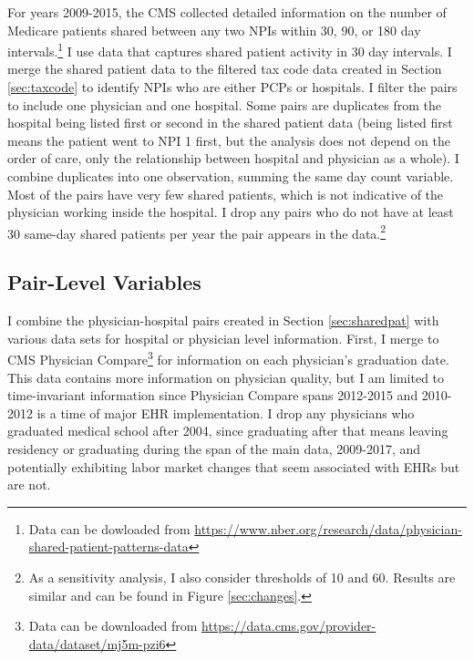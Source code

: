\documentclass[12pt]{article}
\begin{document}
For years 2009-2015, the CMS collected detailed information on the number of Medicare patients shared between any two NPIs within 30, 90, or 180 day intervals.\footnote{Data can be dowloaded from \hyperlink{https://www.nber.org/research/data/physician-shared-patient-patterns-data}{https://www.nber.org/research/data/physician-shared-patient-patterns-data}} I use data that captures shared patient activity in 30 day intervals. I merge the shared patient data to the filtered tax code data created in Section \ref{sec:taxcode} to identify NPIs who are either PCPs or hospitals. I filter the pairs to include one physician and one hospital. Some pairs are duplicates from the hospital being listed first or second in the shared patient data (being listed first means the patient went to NPI 1 first, but the analysis does not depend on the order of care, only the relationship between hospital and physician as a whole). I combine duplicates into one observation, summing the same day count variable. Most of the pairs have very few shared patients, which is not indicative of the physician working inside the hospital. I drop any pairs who do not have at least 30 same-day shared patients per year the pair appears in the data.\footnote{As a sensitivity analysis, I also consider thresholds of 10 and 60. Results are similar and can be found in Figure \ref{sec:changes}.}

\subsection{Pair-Level Variables}

I combine the physician-hospital pairs created in Section \ref{sec:sharedpat} with various data sets for hospital or physician level information. First, I merge to CMS Physician Compare\footnote{Data can be downloaded from \hyperlink{https://data.cms.gov/provider-data/dataset/mj5m-pzi6}{https://data.cms.gov/provider-data/dataset/mj5m-pzi6}} for information on each physician's graduation date. This data contains more information on physician quality, but I am limited to time-invariant information since Physician Compare spans 2012-2015 and 2010-2012 is a time of major EHR implementation. I drop any physicians who graduated medical school after 2004, since graduating after that means leaving residency or graduating during the span of the main data, 2009-2017, and potentially exhibiting labor market changes that seem associated with EHRs but are not. 
\end{document}
